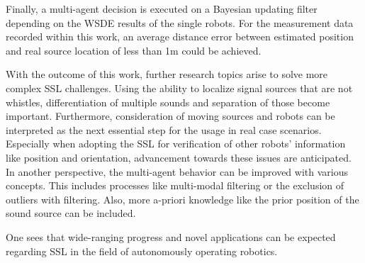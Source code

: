 Finally, a multi-agent decision is executed on a Bayesian updating filter
depending on the \ac{WSDE} results of the single robots.
For the measurement data recorded within this work, an average
distance error between estimated position and real source location
of less than 1\si{\meter} could be achieved.

With the outcome of this work, further research topics arise to solve
more complex \ac{SSL} challenges.
Using the ability to localize signal sources that are not whistles,
differentiation of multiple sounds and separation of those become important.
Furthermore, consideration of moving sources and robots can be interpreted
as the next essential step for the usage in real case scenarios.
Especially when adopting the \ac{SSL} for verification of other robots' information
like position and orientation, advancement towards these issues are anticipated.
In another perspective, the multi-agent behavior can be improved with various
concepts.
This includes processes like multi-modal filtering or the exclusion of outliers
with filtering.
Also, more a-priori knowledge like the prior position of the sound source can be included.

One sees that wide-ranging progress and novel applications can be expected regarding \ac{SSL}
in the field of autonomously operating robotics.

